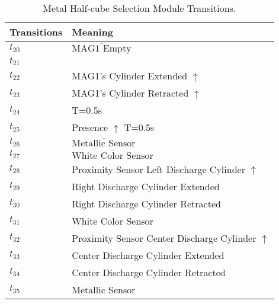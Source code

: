 \begin{table}[H]
\caption{Metal Half-cube Selection Module Transitions.}
\centering
\begin{tabular}{M{5cm}M{10cm}}
Transitions & Meaning\\
\hline
\hyperlink{partialNet:t201}{\hypertarget{partialTable:t20}{$t_{20}$}} & \(\overline{\mbox{MAG1 Empty}}\)\\
\hyperlink{partialNet:t211}{\hypertarget{partialTable:t21}{$t_{21}$}} & \\
\hyperlink{partialNet:t221}{\hypertarget{partialTable:t22}{$t_{22}$}} & MAG1's Cylinder Extended \(\uparrow\)\\
\hyperlink{partialNet:t231}{\hypertarget{partialTable:t23}{$t_{23}$}} & MAG1's Cylinder Retracted \(\uparrow\)\\
\hyperlink{partialNet:tt241}{\hypertarget{partialTable:tt24}{$t_{24}$}} & T=0.5s\\
\hyperlink{partialNet:tt251}{\hypertarget{partialTable:tt25}{$t_{25}$}} & Presence \(\uparrow\) T=0.5s\\
\hyperlink{partialNet:t261}{\hypertarget{partialTable:t26}{$t_{26}$}} & \(\overline{\mbox{Metallic Sensor}}\)\\
\hyperlink{partialNet:t271}{\hypertarget{partialTable:t27}{$t_{27}$}} & \(\overline{\mbox{White Color Sensor}}\)\\
\hyperlink{partialNet:t281}{\hypertarget{partialTable:t28}{$t_{28}$}} & Proximity Sensor Left Discharge Cylinder \(\uparrow\)\\
\hyperlink{partialNet:t291}{\hypertarget{partialTable:t29}{$t_{29}$}} & Right Discharge Cylinder Extended\\
\hyperlink{partialNet:t301}{\hypertarget{partialTable:t30}{$t_{30}$}} & Right Discharge Cylinder Retracted\\
\hyperlink{partialNet:t311}{\hypertarget{partialTable:t31}{$t_{31}$}} & White Color Sensor\\
\hyperlink{partialNet:t321}{\hypertarget{partialTable:t32}{$t_{32}$}} & Proximity Sensor Center Discharge Cylinder \(\uparrow\)\\
\hyperlink{partialNet:t331}{\hypertarget{partialTable:t33}{$t_{33}$}} & Center Discharge Cylinder Extended\\
\hyperlink{partialNet:t341}{\hypertarget{partialTable:t34}{$t_{34}$}} & Center Discharge Cylinder Retracted\\
\hyperlink{partialNet:t351}{\hypertarget{partialTable:t35}{$t_{35}$}} & Metallic Sensor\\

\end{tabular}
\end{table}
